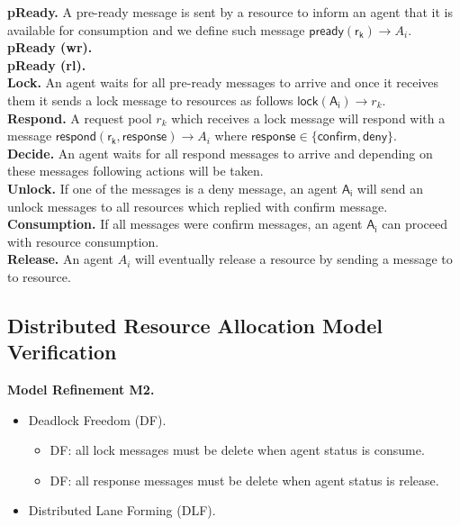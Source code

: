 \documentclass[10pt,a4paper]{report}
\begin{document}
	\noindent \textbf{pReady.} A pre-ready message is sent by a resource to inform an agent that it is available for consumption and we define such message $\mathsf{pready(\mathsf r_k)} \rightarrow A_i$.\\
	
	\textbf{pReady (wr).} \\
	
	\textbf{pReady (rl).} \\
	
	\noindent \textbf{Lock.} An agent waits for all pre-ready messages to arrive and once it receives them it sends a lock message to resources as follows $\mathsf{lock(\mathsf A_i)} \rightarrow r_k$.\\
	
	\noindent \textbf{Respond.} A request pool $r_k$ which receives a lock message will respond with a message $\mathsf{respond(\mathsf r_k, response)} \rightarrow A_i$ where $\mathsf{response \in \{confirm, deny\}}$. \\
	
	\noindent \textbf{Decide.} An agent waits for all respond messages to arrive and depending on these messages following actions will be taken. \\
	
	\textbf{Unlock.} If one of the messages is a deny message, an agent $\mathsf{A_i}$ will send an unlock messages to all resources which replied with confirm message. \\
	
	\textbf{Consumption.} If all messages were confirm messages, an agent $\mathsf{A_i}$ can proceed with resource consumption.\\
	
	\noindent \textbf{Release.} An agent $A_i$ will eventually release a resource by sending a message to to resource. \vspace{1cm} \\
	
		\pagebreak
	\subsection*{Distributed Resource Allocation Model Verification} 
	\vspace{.5cm}
	
	\noindent \textbf{Model Refinement M2.}
	
	\begin{itemize}
		\item Deadlock Freedom (DF).
		\begin{itemize}
			\item DF: all lock messages must be delete when agent status is consume.
			\item DF: all response messages must be delete when agent status is release.
		\end{itemize}
		\item Distributed Lane Forming (DLF). 
	\end{itemize}
\end{document}

